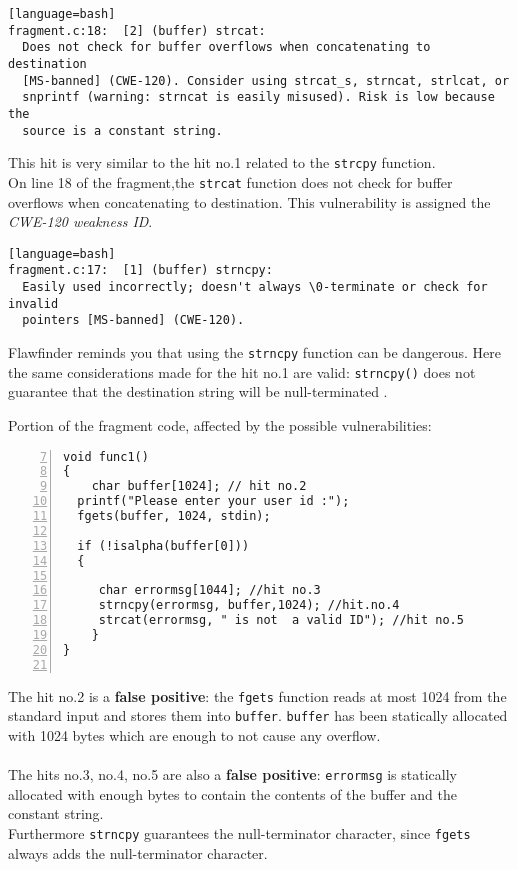\documentclass[a4paper,12pt]{article}
\begin{document}
\begin{lstlisting}[style=DOS][language=bash]
fragment.c:18:  [2] (buffer) strcat:
  Does not check for buffer overflows when concatenating to destination
  [MS-banned] (CWE-120). Consider using strcat_s, strncat, strlcat, or
  snprintf (warning: strncat is easily misused). Risk is low because the
  source is a constant string.
\end{lstlisting}
This hit is very similar to the hit no.1 related to the \texttt{strcpy} function.\\
On line 18 of the fragment,the \texttt{strcat} function does not check for buffer overflows when concatenating to destination. This vulnerability is assigned the \textit{CWE-120 weakness ID}.\\
\begin{lstlisting}[style=DOS][language=bash]
fragment.c:17:  [1] (buffer) strncpy:
  Easily used incorrectly; doesn't always \0-terminate or check for invalid
  pointers [MS-banned] (CWE-120).
\end{lstlisting}
Flawfinder reminds you that using the \texttt{strncpy} function can be dangerous.
Here the same considerations made for the hit no.1 are valid: \texttt{strncpy()} does not guarantee that the destination string will be null-terminated \cite{geeksstrcpy}.
\newpage
\noindent

Portion of the fragment code, affected by the possible vulnerabilities:
\begin{lstlisting}[style=c,numbers=left,firstnumber=7,linebackgroundcolor={
\ifnum\value{lstnumber}=9\color{green}\fi
\ifnum\value{lstnumber}=16\color{green}\fi
\ifnum\value{lstnumber}=17\color{green}\fi
\ifnum\value{lstnumber}=18\color{green}\fi}]
void func1()
{	
	char buffer[1024]; // hit no.2
  printf("Please enter your user id :");
  fgets(buffer, 1024, stdin);
 
  if (!isalpha(buffer[0]))
  {

     char errormsg[1044]; //hit no.3
     strncpy(errormsg, buffer,1024); //hit.no.4
     strcat(errormsg, " is not  a valid ID"); //hit no.5
 	}
}


\end{lstlisting}
The hit no.2 is a \textbf{false positive}: the \texttt{fgets} function reads at most 1024 from the standard input and stores them into \texttt{buffer}. \texttt{buffer} has been statically allocated with 1024 bytes which are enough to not cause any overflow.\\\\
The hits no.3, no.4, no.5 are also a \textbf{false positive}: \texttt{errormsg} is statically allocated with enough bytes to contain the contents of the buffer and the constant string.\\
Furthermore \texttt{strncpy} guarantees the null-terminator character, since \texttt{fgets} always adds the null-terminator character.
\\
\\
\end{document}
